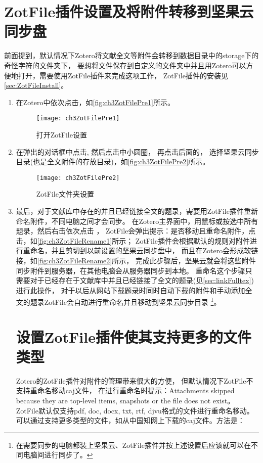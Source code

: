 \documentclass[cn,11pt,chinese]{elegantbook}
\begin{document}
	\section{ZotFile插件设置及将附件转移到坚果云同步盘}\label{sec:zotFilePre}
		前面提到，默认情况下Zotero将文献全文等附件会转移到数据目录中的storage下的奇怪字符的文件夹下，
		要想将文件保存到自定义的文件夹中并且用Zotero可以方便地打开，需要使用ZotFile插件来完成这项工作，
		ZotFile插件的安装见\cref{sec:ZotFileInstall}。
		\begin{enumerate}
			\item 在Zotero中依次点击，如\autoref{fig:ch3ZotFilePre1}所示。
			\begin{figure}[t]
				\centering
				\texttt{[image: ch3ZotFilePre1]}
				\caption{打开ZotFile设置}
				\label{fig:ch3ZotFilePre1}
			\end{figure}
			\item 在弹出的对话框中点击,
			然后点击中小圆圈，
			再点击后面的，
			选择坚果云同步目录(也是全文附件的存放目录)，如\autoref{fig:ch3ZotFilePre2}所示。
			\begin{figure}[htbp]
				\centering
				\texttt{[image: ch3ZotFilePre2]}
				\caption{ZotFile文件夹设置}
				\label{fig:ch3ZotFilePre2}
			\end{figure}
			\item 最后，对于文献库中存在的并且已经链接全文的题录，需要用ZotFile插件重新命名附件，不同电脑之间才会同步。
			在Zotero主界面中，用鼠标或按选中所有题录，然后右击依次点击
			，
			ZotFile会弹出提示：是否移动且重命名附件，点击，如\autoref{fig:ch3ZotFileRename1}所示；
			ZotFile插件会根据默认的规则对附件进行重命名，并且剪切到以前设置的坚果云同步盘中，
			而且在Zotero会形成软链接，如\autoref{fig:ch3ZotFileRename2}所示，
			完成此步骤后，坚果云就会将这些附件同步附件到服务器，在其他电脑会从服务器同步到本地。
			重命名这个步骤只需要对于已经存在于文献库中并且已经链接了全文的题录(见\cref{sec:linkFulltex})进行此操作，
			对于以后从网站下载题录时同时自动下载的附件和手动添加全文的题录ZotFile会自动进行重命名并且移动到坚果云同步目录
			\footnote{在需要同步的电脑都装上坚果云、ZotFile插件并按上述设置后应该就可以在不同电脑间进行同步了。}。
	


	\section{设置ZotFile插件使其支持更多的文件类型}\label{sec:zotFile_more_filetype}
	    \quad \quad Zotero的ZotFile插件对附件的管理带来很大的方便，
		但默认情况下ZotFile不支持重命名移动caj文件，
		在进行重命名时提示：Attachments skipped because they are top-level items, 
		snapshots or the file does not exist。
		ZotFile默认仅支持pdf, doc, docx, txt, rtf, djvu格式的文件进行重命名移动。
		可以通过支持更多类型的文件，如从中国知网上下载的caj文件。方法是：


\end{enumerate}
\end{document}
